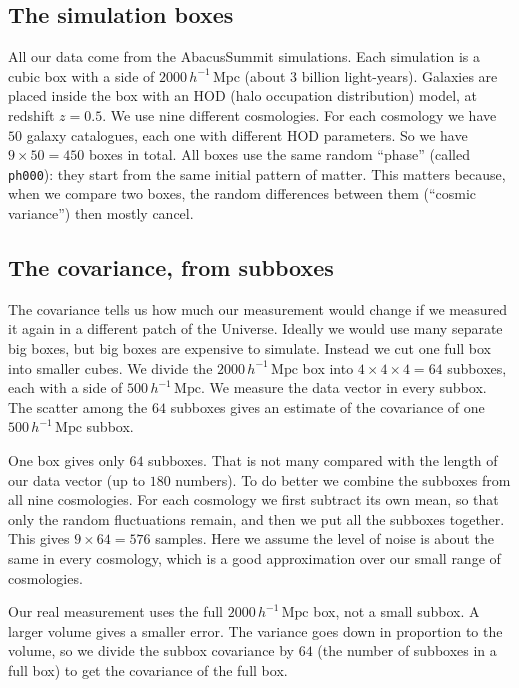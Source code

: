 \documentclass[11pt]{article}
\newcommand{\Mpch}{\,h^{-1}\,\mathrm{Mpc}}
\newcommand{\code}[1]{\texttt{#1}}
\begin{document}
\subsection*{The simulation boxes}

All our data come from the AbacusSummit simulations.  Each simulation is a cubic
box with a side of $2000\Mpch$ (about $3$ billion light-years).  Galaxies are
placed inside the box with an HOD (halo occupation distribution) model, at
redshift $z=0.5$.  We use nine different cosmologies.  For each cosmology we have
$50$ galaxy catalogues, each one with different HOD parameters.  So we have
$9\times50 = 450$ boxes in total.  All boxes use the same random ``phase''
(called \code{ph000}): they start from the same initial pattern of matter.  This
matters because, when we compare two boxes, the random differences between them
(``cosmic variance'') then mostly cancel.

\subsection*{The covariance, from subboxes}

The covariance tells us how much our measurement would change if we measured it
again in a different patch of the Universe.  Ideally we would use many separate
big boxes, but big boxes are expensive to simulate.  Instead we cut one full box
into smaller cubes.  We divide the $2000\Mpch$ box into $4\times4\times4 = 64$
subboxes, each with a side of $500\Mpch$.  We measure the data vector in every
subbox.  The scatter among the $64$ subboxes gives an estimate of the covariance
of one $500\Mpch$ subbox.

One box gives only $64$ subboxes.  That is not many compared with the length of
our data vector (up to $180$ numbers).  To do better we combine the subboxes from
all nine cosmologies.  For each cosmology we first subtract its own mean, so that
only the random fluctuations remain, and then we put all the subboxes together.
This gives $9\times64 = 576$ samples.  Here we assume the level of noise is about
the same in every cosmology, which is a good approximation over our small range
of cosmologies.

Our real measurement uses the full $2000\Mpch$ box, not a small subbox.  A larger
volume gives a smaller error.  The variance goes down in proportion to the volume,
so we divide the subbox covariance by $64$ (the number of subboxes in a full box)
to get the covariance of the full box.
\end{document}
